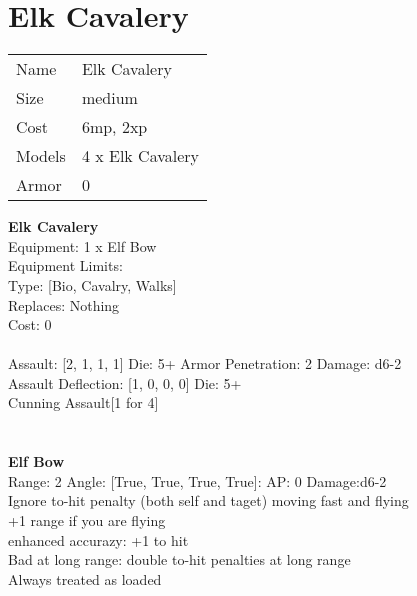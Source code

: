\pagebreak\pagebreak

\section{ Elk Cavalery }

\begin{tabular}{ll}
  Name & Elk Cavalery \\
  Size & medium\\
  Cost & 6mp, 2xp\\
  Models & 4 x Elk Cavalery\\
  Armor & 0\\
\end{tabular}

\noindent 

{\bf Elk Cavalery } \\
Equipment: 1 x Elf Bow \\
Equipment Limits:  \\
Type: [Bio, Cavalry, Walks] \\
Replaces: Nothing \\
Cost: 0\\
\ \\
Assault: [2, 1, 1, 1] Die: 5+ Armor Penetration: 2 Damage: d6-2 \\
Assault Deflection: [1, 0, 0, 0] Die: 5+\\
\indent Cunning Assault[1 for 4]\\ 
 
\ \\

\ \\
{\bf Elf Bow } \\



Range: 2  Angle: [True, True, True, True]: AP: 0 Damage:d6-2 \\
Ignore to-hit penalty (both self and taget) moving fast and flying\\ 
+1 range if you are flying\\ 
enhanced accurazy: +1 to hit\\ 
Bad at long range: double to-hit penalties at long range\\ 
Always treated as loaded\\ 




 
\ \\



